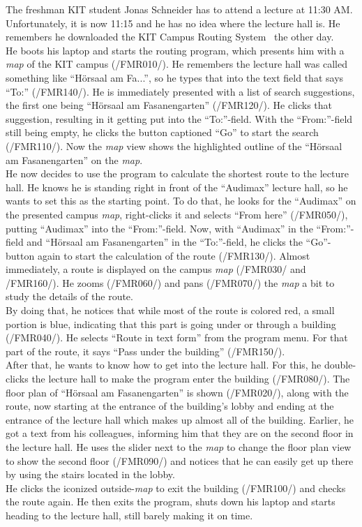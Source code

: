 The freshman KIT student Jonas Schneider has to attend a lecture at 11:30 AM. Unfortunately, it is now 11:15  and he has no idea where the lecture hall is. He remembers he downloaded the KIT Campus Routing System \programName~the other day.\\
He boots his laptop and starts the routing program, which presents him with a \textit{map} of the KIT campus (/FMR010/). He remembers the lecture hall was called something like ``H\"orsaal am Fa...'', so he types that into the text field that says ``To:'' (/FMR140/). He is immediately presented with a list of
search suggestions, the first one being ``H\"orsaal am Fasanengarten'' (/FMR120/).
He clicks that suggestion, resulting in it getting put into the ``To:''-field. With the ``From:''-field still being empty, he clicks the button captioned ``Go'' to start the search (/FMR110/). Now the \textit{map} view shows the highlighted outline of the ``H\"orsaal am Fasanengarten'' on the \textit{map}.\\
He now decides to use the program to calculate the shortest route to the lecture hall.
He knows he is standing right in front of the ``Audimax'' lecture hall, so he wants to set this as the starting point. To do that, he looks for the ``Audimax'' on the presented campus \textit{map}, right-clicks it and selects ``From here'' (/FMR050/), putting ``Audimax'' into the ``From:''-field.
Now, with ``Audimax'' in the ``From:''-field and ``H\"orsaal am Fasanengarten'' in the ``To:''-field, he clicks the ``Go''-button again to start the calculation of the route (/FMR130/). Almost immediately, a route is displayed on the campus \textit{map} (/FMR030/ and /FMR160/).
He zooms (/FMR060/) and pans (/FMR070/) the \textit{map} a bit to study the details of the route.\\
By doing that, he notices that while most of the route is colored red, a small portion is blue, indicating that this part is going under or through a building (/FMR040/). He selects ``Route in text form'' from the program menu. For that part of the route, it says ``Pass under the building'' (/FMR150/).\\
After that, he wants to know how to get into the lecture hall. For this, he double-clicks the lecture hall to make the program enter the building (/FMR080/). The floor plan of ``H\"orsaal am Fasanengarten'' is shown (/FMR020/), along with the route, now starting at the entrance of the building's lobby and ending at the entrance of
the lecture hall which makes up almost all of the building. Earlier, he got a text from his colleagues, informing him that they are on the second floor in the lecture hall. He uses the slider next to the \textit{map} to change the floor plan view to show the second floor (/FMR090/) and notices that he can easily get up there by
using the stairs located in the lobby. \\
He clicks the iconized outside-\textit{map} to exit the building (/FMR100/) and checks the route again. He then exits the program, shuts down his laptop and starts heading to the lecture hall, still barely making it on time.

